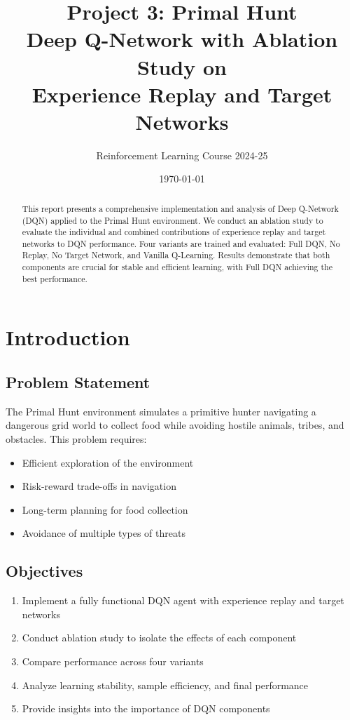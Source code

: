 \documentclass[12pt,a4paper]{article}
\title{\textbf{Project 3: Primal Hunt}\\
\large Deep Q-Network with Ablation Study on\\
Experience Replay and Target Networks}
\author{Reinforcement Learning Course 2024-25}
\date{\today}
\begin{document}
\maketitle

\begin{abstract}
This report presents a comprehensive implementation and analysis of Deep Q-Network (DQN) applied to the Primal Hunt environment. We conduct an ablation study to evaluate the individual and combined contributions of experience replay and target networks to DQN performance. Four variants are trained and evaluated: Full DQN, No Replay, No Target Network, and Vanilla Q-Learning. Results demonstrate that both components are crucial for stable and efficient learning, with Full DQN achieving the best performance.
\end{abstract}

\tableofcontents
\newpage

\section{Introduction}

\subsection{Problem Statement}
The Primal Hunt environment simulates a primitive hunter navigating a dangerous grid world to collect food while avoiding hostile animals, tribes, and obstacles. This problem requires:
\begin{itemize}
    \item Efficient exploration of the environment
    \item Risk-reward trade-offs in navigation
    \item Long-term planning for food collection
    \item Avoidance of multiple types of threats
\end{itemize}

\subsection{Objectives}
\begin{enumerate}
    \item Implement a fully functional DQN agent with experience replay and target networks
    \item Conduct ablation study to isolate the effects of each component
    \item Compare performance across four variants
    \item Analyze learning stability, sample efficiency, and final performance
    \item Provide insights into the importance of DQN components
\end{enumerate}
\end{document}
